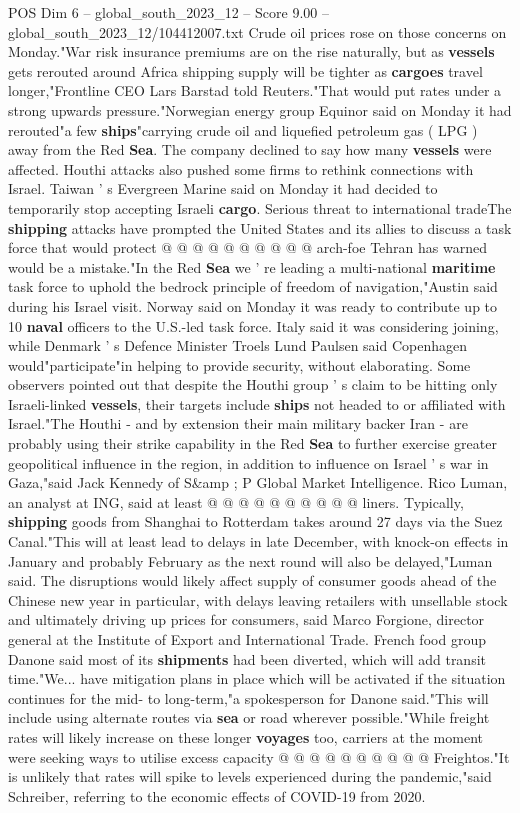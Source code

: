 \begin{textsample}{POS Dim 6 – global\_south\_2023\_12 – Score 9.00 – global\_south\_2023\_12/104412007.txt}
Crude oil prices rose on those concerns on Monday."War risk insurance premiums are on the rise naturally, but as \textbf{vessels} gets rerouted around Africa shipping supply will be tighter as \textbf{cargoes} travel longer,"Frontline CEO Lars Barstad told Reuters."That would put rates under a strong upwards pressure."Norwegian energy group Equinor said on Monday it had rerouted"a few \textbf{ships}"carrying crude oil and liquefied petroleum gas ( LPG ) away from the Red \textbf{Sea}.
The company declined to say how many \textbf{vessels} were affected.
Houthi attacks also pushed some firms to rethink connections with Israel.
Taiwan ' s Evergreen Marine said on Monday it had decided to temporarily stop accepting Israeli \textbf{cargo}.
Serious threat to international tradeThe \textbf{shipping} attacks have prompted the United States and its allies to discuss a task force that would protect @ @ @ @ @ @ @ @ @ @ arch-foe Tehran has warned would be a mistake."In the Red \textbf{Sea} we ' re leading a multi-national \textbf{maritime} task force to uphold the bedrock principle of freedom of navigation,"Austin said during his Israel visit.
Norway said on Monday it was ready to contribute up to 10 \textbf{naval} officers to the U.S.-led task force.
Italy said it was considering joining, while Denmark ' s Defence Minister Troels Lund Paulsen said Copenhagen would"participate"in helping to provide security, without elaborating.
Some observers pointed out that despite the Houthi group ' s claim to be hitting only Israeli-linked \textbf{vessels}, their targets include \textbf{ships} not headed to or affiliated with Israel."The Houthi - and by extension their main military backer Iran - are probably using their strike capability in the Red \textbf{Sea} to further exercise greater geopolitical influence in the region, in addition to influence on Israel ' s war in Gaza,"said Jack Kennedy of S\&amp ; P Global Market Intelligence.
Rico Luman, an analyst at ING, said at least @ @ @ @ @ @ @ @ @ @ liners.
Typically, \textbf{shipping} goods from Shanghai to Rotterdam takes around 27 days via the Suez Canal."This will at least lead to delays in late December, with knock-on effects in January and probably February as the next round will also be delayed,"Luman said.
The disruptions would likely affect supply of consumer goods ahead of the Chinese new year in particular, with delays leaving retailers with unsellable stock and ultimately driving up prices for consumers, said Marco Forgione, director general at the Institute of Export and International Trade.
French food group Danone said most of its \textbf{shipments} had been diverted, which will add transit time."We... have mitigation plans in place which will be activated if the situation continues for the mid- to long-term,"a spokesperson for Danone said."This will include using alternate routes via \textbf{sea} or road wherever possible."While freight rates will likely increase on these longer \textbf{voyages} too, carriers at the moment were seeking ways to utilise excess capacity @ @ @ @ @ @ @ @ @ @ Freightos."It is unlikely that rates will spike to levels experienced during the pandemic,"said Schreiber, referring to the economic effects of COVID-19 from 2020.

\end{textsample}
